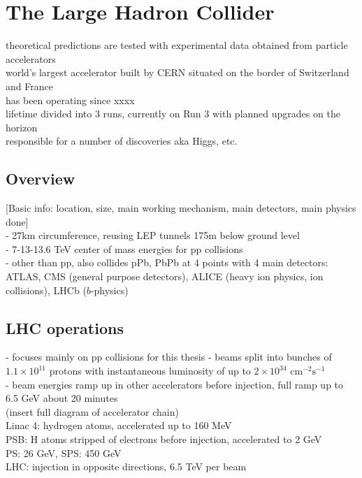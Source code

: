 \documentclass[../thesis.tex]{subfiles}
\begin{document}
\vspace{-1\baselineskip}

\section{The Large Hadron Collider}
\label{sec:LHC}
theoretical predictions are tested with experimental data obtained from particle accelerators\\
world's largest accelerator built by CERN situated on the border of Switzerland and France\\
has been operating since xxxx\\
lifetime divided into 3 runs, currently on Run 3 with planned upgrades on the horizon\\
responsible for a number of discoveries aka Higgs, etc.

\subsection{Overview}
[Basic info: location, size, main working mechanism, main detectors, main physics done]\\
- 27km circumference, reusing LEP tunnels 175m below ground level\\
- 7-13-13.6 TeV center of mass energies for pp collisions\\
- other than pp, also collides pPb, PbPb at 4 points with 4 main detectors: ATLAS, CMS (general purpose detectors), ALICE (heavy ion physics, ion collisions), LHCb ($b$-physics)

\subsection{LHC operations}
- focuses mainly on pp collisions for this thesis
- beams split into bunches of $1.1\times 10^{11}$ protons with instantaneous luminosity of up to $2\times 10^{34} \text{ cm}^{-2}\text{s}^{-1}$\\
- beam energies ramp up in other accelerators before injection, full ramp up to 6.5 GeV about 20 minutes\\
(insert full diagram of accelerator chain)\\
Linac 4: hydrogen atoms, accelerated up to 160 MeV\\
PSB: H atoms stripped of electrons before injection, accelerated to 2 GeV\\
PS: 26 GeV, SPS: 450 GeV\\
LHC: injection in opposite directions, 6.5 TeV per beam\\
\end{document}
